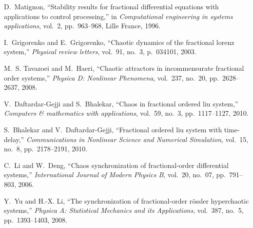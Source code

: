 \begin{thebibliography}{10}
		D.~Matignon, ``Stability results for fractional differential equations with
		applications to control processing,'' in {\em Computational engineering in
			systems applications}, vol.~2, pp.~963--968, Lille France, 1996.
		
		I.~Grigorenko and E.~Grigorenko, ``Chaotic dynamics of the fractional lorenz
		system,'' {\em Physical review letters}, vol.~91, no.~3, p.~034101, 2003.
		
		M.~S. Tavazoei and M.~Haeri, ``Chaotic attractors in incommensurate fractional
		order systems,'' {\em Physica D: Nonlinear Phenomena}, vol.~237, no.~20,
		pp.~2628--2637, 2008.
		
		V.~Daftardar-Gejji and S.~Bhalekar, ``Chaos in fractional ordered liu system,''
		{\em Computers \& mathematics with applications}, vol.~59, no.~3,
		pp.~1117--1127, 2010.
		
		S.~Bhalekar and V.~Daftardar-Gejji, ``Fractional ordered liu system with
		time-delay,'' {\em Communications in Nonlinear Science and Numerical
			Simulation}, vol.~15, no.~8, pp.~2178--2191, 2010.
		
		C.~Li and W.~Deng, ``Chaos synchronization of fractional-order differential
		systems,'' {\em International Journal of Modern Physics B}, vol.~20, no.~07,
		pp.~791--803, 2006.
		
		Y.~Yu and H.-X. Li, ``The synchronization of fractional-order r{\"o}ssler
		hyperchaotic systems,'' {\em Physica A: Statistical Mechanics and its
			Applications}, vol.~387, no.~5, pp.~1393--1403, 2008.
		
	\end{thebibliography}
	